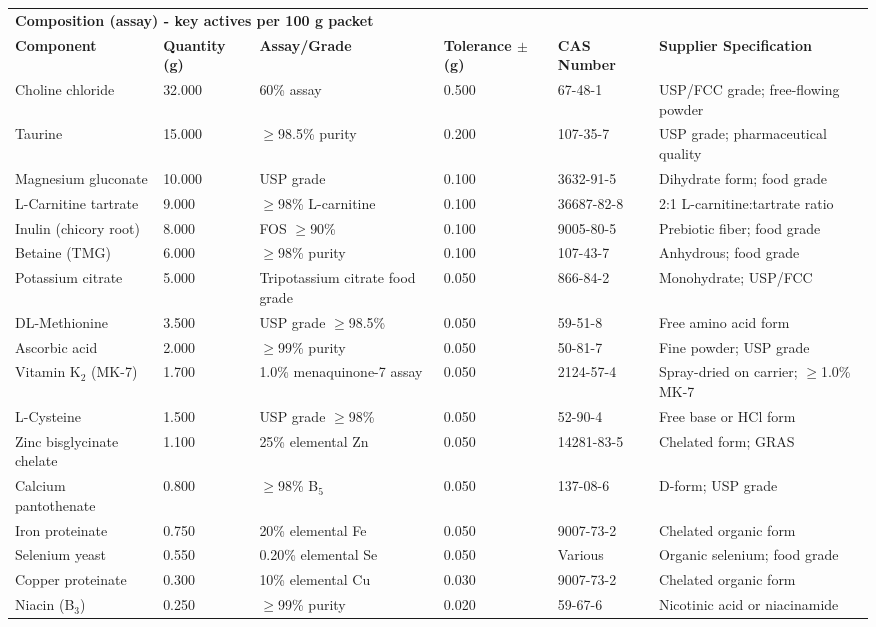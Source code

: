 \begin{longtable}{@{}p{6.0cm}p{1.5cm}p{1.8cm}p{2.0cm}p{3.0cm}p{3.0cm}@{}}
\multicolumn{6}{l}{\textbf{Composition (assay) - key actives per 100 g packet}}  \\[3pt]
\textbf{Component} & \textbf{Quantity (g)} & \textbf{Assay/Grade} & \textbf{Tolerance $\pm$ (g)} & \textbf{CAS Number} & \textbf{Supplier Specification} \\
\midrule
Choline chloride & 32.000 & 60\% assay & 0.500 & 67-48-1 & USP/FCC grade; free-flowing powder \\[3pt]
Taurine & 15.000 & $\ge$98.5\% purity & 0.200 & 107-35-7 & USP grade; pharmaceutical quality \\[3pt]
Magnesium gluconate & 10.000 & USP grade & 0.100 & 3632-91-5 & Dihydrate form; food grade \\[3pt]
L-Carnitine tartrate & 9.000 & $\ge$98\% L-carnitine & 0.100 & 36687-82-8 & 2:1 L-carnitine:tartrate ratio \\[3pt]
Inulin (chicory root) & 8.000 & FOS $\ge$90\% & 0.100 & 9005-80-5 & Prebiotic fiber; food grade \\[3pt]
Betaine (TMG) & 6.000 & $\ge$98\% purity & 0.100 & 107-43-7 & Anhydrous; food grade \\[3pt]
Potassium citrate & 5.000 & Tripotassium citrate food grade & 0.050 & 866-84-2 & Monohydrate; USP/FCC \\[3pt]
DL-Methionine & 3.500 & USP grade $\ge$98.5\% & 0.050 & 59-51-8 & Free amino acid form \\[3pt]
Ascorbic acid & 2.000 & $\ge$99\% purity & 0.050 & 50-81-7 & Fine powder; USP grade \\[3pt]
Vitamin K$_2$ (MK-7) & 1.700 & 1.0\% menaquinone-7 assay & 0.050 & 2124-57-4 & Spray-dried on carrier; $\ge$1.0\% MK-7 \\[3pt]
L-Cysteine & 1.500 & USP grade $\ge$98\% & 0.050 & 52-90-4 & Free base or HCl form \\[3pt]
Zinc bisglycinate chelate & 1.100 & 25\% elemental Zn & 0.050 & 14281-83-5 & Chelated form; GRAS \\[3pt]
Calcium pantothenate & 0.800 & $\ge$98\% B$_5$ & 0.050 & 137-08-6 & D-form; USP grade \\[3pt]
Iron proteinate & 0.750 & 20\% elemental Fe & 0.050 & 9007-73-2 & Chelated organic form \\[3pt]
Selenium yeast & 0.550 & 0.20\% elemental Se & 0.050 & Various & Organic selenium; food grade \\[3pt]
Copper proteinate & 0.300 & 10\% elemental Cu & 0.030 & 9007-73-2 & Chelated organic form \\[3pt]
Niacin (B$_3$) & 0.250 & $\ge$99\% purity & 0.020 & 59-67-6 & Nicotinic acid or niacinamide \\[3pt]

\end{longtable}
